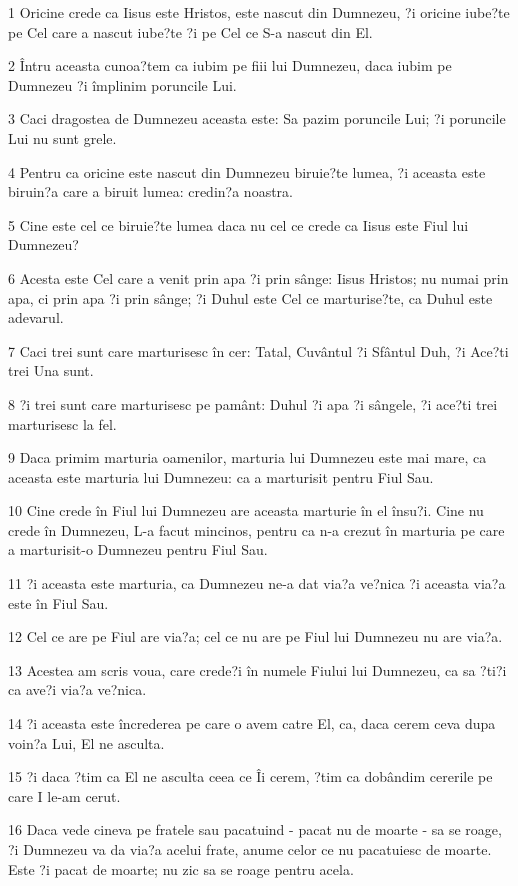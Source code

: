 \par 1 Oricine crede ca Iisus este Hristos, este nascut din Dumnezeu, ?i oricine iube?te pe Cel care a nascut iube?te ?i pe Cel ce S-a nascut din El.
\par 2 Întru aceasta cunoa?tem ca iubim pe fiii lui Dumnezeu, daca iubim pe Dumnezeu ?i împlinim poruncile Lui.
\par 3 Caci dragostea de Dumnezeu aceasta este: Sa pazim poruncile Lui; ?i poruncile Lui nu sunt grele.
\par 4 Pentru ca oricine este nascut din Dumnezeu biruie?te lumea, ?i aceasta este biruin?a care a biruit lumea: credin?a noastra.
\par 5 Cine este cel ce biruie?te lumea daca nu cel ce crede ca Iisus este Fiul lui Dumnezeu?
\par 6 Acesta este Cel care a venit prin apa ?i prin sânge: Iisus Hristos; nu numai prin apa, ci prin apa ?i prin sânge; ?i Duhul este Cel ce marturise?te, ca Duhul este adevarul.
\par 7 Caci trei sunt care marturisesc în cer: Tatal, Cuvântul ?i Sfântul Duh, ?i Ace?ti trei Una sunt.
\par 8 ?i trei sunt care marturisesc pe pamânt: Duhul ?i apa ?i sângele, ?i ace?ti trei marturisesc la fel.
\par 9 Daca primim marturia oamenilor, marturia lui Dumnezeu este mai mare, ca aceasta este marturia lui Dumnezeu: ca a marturisit pentru Fiul Sau.
\par 10 Cine crede în Fiul lui Dumnezeu are aceasta marturie în el însu?i. Cine nu crede în Dumnezeu, L-a facut mincinos, pentru ca n-a crezut în marturia pe care a marturisit-o Dumnezeu pentru Fiul Sau.
\par 11 ?i aceasta este marturia, ca Dumnezeu ne-a dat via?a ve?nica ?i aceasta via?a este în Fiul Sau.
\par 12 Cel ce are pe Fiul are via?a; cel ce nu are pe Fiul lui Dumnezeu nu are via?a.
\par 13 Acestea am scris voua, care crede?i în numele Fiului lui Dumnezeu, ca sa ?ti?i ca ave?i via?a ve?nica.
\par 14 ?i aceasta este încrederea pe care o avem catre El, ca, daca cerem ceva dupa voin?a Lui, El ne asculta.
\par 15 ?i daca ?tim ca El ne asculta ceea ce Îi cerem, ?tim ca dobândim cererile pe care I le-am cerut.
\par 16 Daca vede cineva pe fratele sau pacatuind - pacat nu de moarte - sa se roage, ?i Dumnezeu va da via?a acelui frate, anume celor ce nu pacatuiesc de moarte. Este ?i pacat de moarte; nu zic sa se roage pentru acela.
